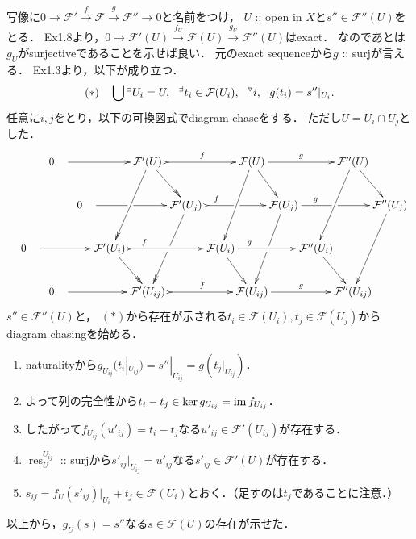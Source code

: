 \documentclass[a4paper]{jsarticle}
\newcommand{\shF}{\mathcal{F}}
\newcommand{\res}{\operatorname{res}}
\begin{document}
    写像に$0 \to \shF' \xrightarrow{f} \shF \xrightarrow{g} \shF'' \to 0$と名前をつけ，
    $U$ :: open in $X$と$s'' \in \shF''(U)$をとる．
    Ex1.8より，$0 \to \shF'(U) \xrightarrow{f_U} \shF(U) \xrightarrow{g_U} \shF''(U)$はexact．
    なのであとは$g_U$がsurjectiveであることを示せば良い．
    元のexact sequenceから$g$ :: surjが言える．
    Ex1.3より，以下が成り立つ．
    \[
        (*)~~~
        \bigcup {}^\exists U_i=U,~~
        \Exists{t_i \in \shF(U_i)}
        \Forall{i} g(t_i)=s''|_{U_i}.
    \]
    任意に$i,j$をとり，以下の可換図式でdiagram chaseをする．
    ただし$U=U_i \cap U_j$とした．
    \[
    \xymatrix@C=-5pt
    {
        {} & ~~~0~~~ \ar[rrr] & {} & {} & \shF'(U)~ \ar@{->>}[rd] \ar@{->>}[ldd] \ar@{>->}[rrr]^-{f} & {} & {} & \shF(U) \ar[rd] \ar[ldd] \ar[rrr]^-{g} & {} & {} & \shF''(U) \ar[rd] \ar[ldd] & {} \\
        {} & {} & ~~~0~~~ \ar[rrr]|(0.47)\hole & {} & {} & \shF'(U_j)~ \ar@{->>}[ldd]|(0.50)\hole \ar@{>->}[rrr]|(0.51)\hole^(0.3){f} & {} & {} & \shF(U_j) \ar[ldd]|(0.50)\hole \ar[rrr]|(0.48)\hole^(0.3){g} & {} & {} & \shF''(U_j) \ar[ldd]& {} \\
        ~~~0~~~ \ar[rrr] & {} & {} & \shF'(U_i)~ \ar@{->>}[rd]\ar@{>->}[rrr]^(0.3){f} & {} & {} & \shF(U_i) \ar[rd]\ar[rrr]^(0.3){g} & {} & {} & \shF''(U_i) \ar[rd]& {} \\
        {} & ~~~0~~~ \ar[rrr] & {} & {} & \shF'(U_{ij})~ \ar@{>->}[rrr]^-{f} & {} & {} & \shF(U_{ij}) \ar[rrr]^-{g} & {} & {} & \shF''(U_{ij})& {} \\
    }
    \]
    $s'' \in \shF''(U)$と，
    $(*)$から存在が示される$t_i \in \shF(U_i), t_j \in \shF(U_j)$から
    diagram chasingを始める．
    \begin{enumerate}[(1)]
    \setlength{\itemindent}{2em}
        \item naturalityから$g_{U_{ij}}(t_i|_{U_{ij}})=s''|_{U_{ij}}=g(t_j|_{U_{ij}})$．
        \item よって列の完全性から$t_i-t_j \in \ker g_{U_{ij}}=\operatorname{im} f_{U_{ij}}$．
        \item したがって$f_{U_{ij}}(u'_{ij})=t_i-t_j$なる$u'_{ij} \in \shF'(U_{ij})$が存在する．
        \item $\res_U^{U_{ij}}$ :: surjから$s'_{ij}|_{U_{ij}}=u'_{ij}$なる$s'_{ij} \in \shF'(U)$が存在する．
        \item $s_{ij}=f_U(s'_{ij})|_{U_i}+t_j \in \shF(U_i)$とおく．（足すのは$t_j$であることに注意．）
    \end{enumerate}
    以上から，$g_U(s)=s''$なる$s \in \shF(U)$の存在が示せた．
\end{document}
